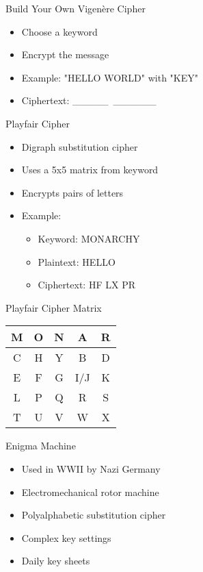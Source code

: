 \begin{withoutheadline}
\begin{frame}{Build Your Own Vigenère Cipher}
\begin{itemize}
    \item Choose a keyword
    \item Encrypt the message
    \item Example: "HELLO WORLD" with "KEY"
    \item Ciphertext: \_\_\_\_\_\ \_\_\_\_\_\_
\end{itemize}
\end{frame}

\begin{frame}{Playfair Cipher}
\begin{itemize}
    \item Digraph substitution cipher
    \item Uses a 5x5 matrix from keyword
    \item Encrypts pairs of letters
    \item Example:
    \begin{itemize}
        \item Keyword: MONARCHY
        \item Plaintext: HELLO
        \item Ciphertext: HF LX PR
    \end{itemize}
\end{itemize}
\end{frame}

\begin{frame}{Playfair Cipher Matrix}
\begin{tabular}{|c|c|c|c|c|}
    \hline
    M & O & N & A & R \\
    \hline
    C & H & Y & B & D \\
    \hline
    E & F & G & I/J & K \\
    \hline
    L & P & Q & R & S \\
    \hline
    T & U & V & W & X \\
    \hline
\end{tabular}
\end{frame}

\begin{frame}{Enigma Machine}
\begin{itemize}
    \item Used in WWII by Nazi Germany
    \item Electromechanical rotor machine
    \item Polyalphabetic substitution cipher
    \item Complex key settings
    \item Daily key sheets
\end{itemize}
\end{frame}


\end{withoutheadline}
